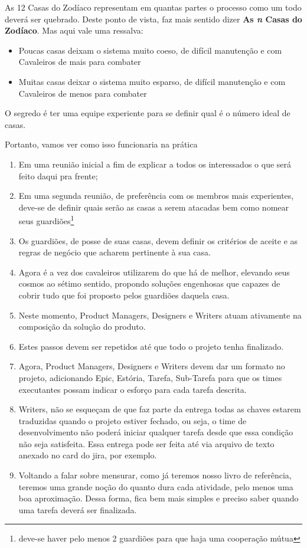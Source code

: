\documentclass[a4paper]{article}
\begin{document}
As 12 Casas do Zodíaco representam em quantas partes o processo como um todo deverá ser quebrado. Deste ponto de vista, faz mais sentido dizer \textbf{As \emph{n} Casas do Zodíaco}. Mas aqui vale uma ressalva: 
\begin{itemize}
    \item Poucas casas deixam o sistema muito coeso, de difícil manutenção e com Cavaleiros de mais para combater
    \item Muitas casas deixar o sistema muito esparso, de difícil manutenção e com Cavaleiros de menos para combater
\end{itemize}

O segredo é ter uma equipe experiente para se definir qual é o número ideal de casas.

Portanto, vamos ver como isso funcionaria na prática
\begin{enumerate}
    \item Em uma reunião inicial a fim de explicar a todos os interessados o que será feito daqui pra frente;
    \item Em uma segunda reunião, de preferência com os membros mais experientes, deve-se de definir quais serão as casas a serem atacadas bem como nomear seus guardiões\footnote{deve-se haver pelo menos 2 guardiões para que haja uma cooperação mútua}
    \item Os guardiões, de posse de suas casas, devem definir os critérios de aceite e as regras de negócio que acharem pertinente à sua casa.
    \item Agora é a vez dos cavaleiros utilizarem do que há de melhor, elevando seus cosmos ao sétimo sentido, propondo soluções engenhosas que capazes de cobrir tudo que foi proposto pelos guardiões daquela casa. 
    \item Neste momento, Product Managers, Designers e Writers atuam ativamente na composição da solução do produto.
    \item Estes passos devem ser repetidos até que todo o projeto tenha finalizado. 
    \item Agora, Product Managers, Designers e Writers devem dar um formato no projeto, adicionando Epic, Estória, Tarefa, Sub-Tarefa para que os times executantes possam indicar o esforço para cada tarefa descrita. 
    \item Writers, não se esqueçam de que faz parte da entrega todas as chaves estarem traduzidas quando o projeto estiver fechado, ou seja, o time de desenvolvimento não poderá iniciar qualquer tarefa desde que essa condição não seja satisfeita. Essa entrega pode ser feita até via arquivo de texto anexado no card do jira, por exemplo.
    \item Voltando a falar sobre mensurar, como já teremos nosso livro de referência, teremos uma grande noção do quanto dura cada atividade, pelo menos uma boa aproximação. Dessa forma, fica bem mais simples e preciso saber quando uma tarefa deverá ser finalizada.
\end{enumerate}
\end{document}
